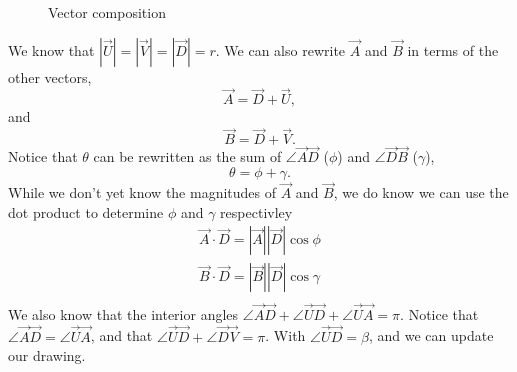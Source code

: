 \documentclass[main.tex]{subfiles}
\begin{document}
{\begin{figure}[h]
    \caption{Vector composition}
\end{figure}


We know that $|\vec{U}| = |\vec{V}| = |\vec{D}| = r$.
We can also rewrite $\vec{A}$ and $\vec{B}$ in terms of the other vectors,
\[\vec{A} = \vec{D} + \vec{U},\] and \[\vec{B} = \vec{D} + \vec{V}.\]
%
Notice that $\theta$ can be rewritten as the sum of 
$\angle{\vec{A}\vec{D}}$ ($\phi$) and $\angle{\vec{D}\vec{B}}$ ($\gamma$),
\[\theta = \phi + \gamma.\]
While we don't yet know the magnitudes of $\vec{A}$ and $\vec{B}$, we do 
know we can use the dot product to determine $\phi$ and $\gamma$ respectivley
%
\begin{align*}
\vec{A}\cdot\vec{D} = |\vec{A}||\vec{D}|\cos{\phi}\\
\vec{B}\cdot\vec{D} = |\vec{B}||\vec{D}|\cos{\gamma}\\
\end{align*}
%
We also know that the interior angles 
$\angle{\vec{A}\vec{D}} + \angle{\vec{U}\vec{D}} + \angle{\vec{U}\vec{A}} = \pi$.
Notice that $\angle{\vec{A}\vec{D}} = \angle{\vec{U}\vec{A}}$, and that 
$\angle{\vec{U}\vec{D}} + \angle{\vec{D}\vec{V}} = \pi$.
With $\angle{\vec{U}\vec{D}} = \beta$, and we can update our drawing.

\def \colphi {3!50!4!50!1}
\def \colgam {5!50!3!50!2}
\def \colbeta {4!50!3}
\def \colpibeta {4!50!5}

\begin{figure}[h]
    \centering
    
\end{figure}}
\end{document}
